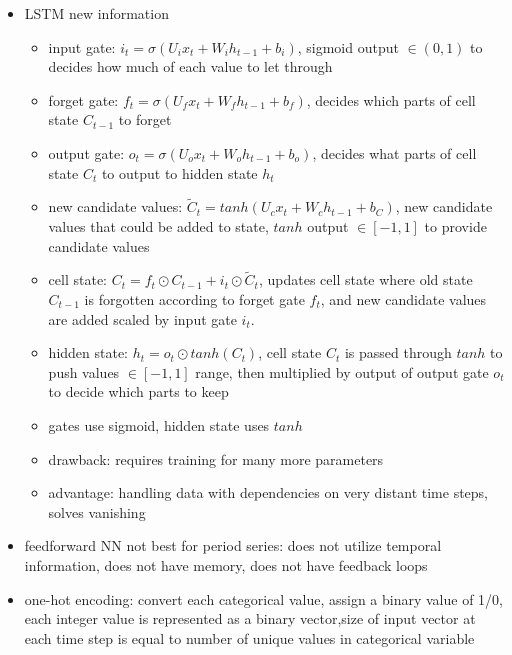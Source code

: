 \documentclass[10pt]{article}
\begin{document}
\begin{itemize}[label=\(\star\), leftmargin=1em, itemsep=-0.3em]
    \item LSTM new information
          \begin{itemize}[label=\(\star\),leftmargin=1em, itemsep=-0.3em]
              \item input gate: $i_t = \sigma(U_i x_t + W_i h_{t-1} + b_i)$, sigmoid output $\in (0,1)$ to decides how much of each value to let through
              \item forget gate: $f_t = \sigma(U_f x_t + W_f h_{t-1} + b_f)$, decides which parts of cell state $C_{t-1}$ to forget
              \item output gate: $o_t = \sigma(U_o x_t + W_o h_{t-1} + b_o)$, decides what parts of cell state $C_t$ to output to hidden state $h_t$
              \item new candidate values: $\tilde{C}_t = tanh(U_c x_t + W_c h_{t-1} + b_C)$, new candidate values that could be added to state, $tanh$ output $\in [-1,1]$ to provide candidate values
              \item cell state: $C_t = f_t \odot C_{t-1} + i_t \odot \tilde{C}_t$, updates cell state where old state $C_{t-1}$ is forgotten according to forget gate $f_t$, and new candidate values are added scaled by input gate $i_t$.
              \item hidden state: $h_t = o_t \odot tanh(C_t)$, cell state $C_t$ is passed through $tanh$ to push values $\in [-1,1]$ range, then multiplied by output of output gate $o_t$ to decide which parts to keep
              \item gates use sigmoid, hidden state uses $tanh$
              \item drawback: requires training for many more parameters
              \item advantage: handling data with dependencies on very distant time steps, solves vanishing
          \end{itemize}
    \item feedforward NN not best for period series: does not utilize temporal information, does not have memory, does not have feedback loops
    \item one-hot encoding: convert each categorical value, assign a binary value of 1/0, each integer value is represented as a binary vector,size of input vector at each time step is equal to number of unique values in categorical variable
\end{itemize}
\end{document}
